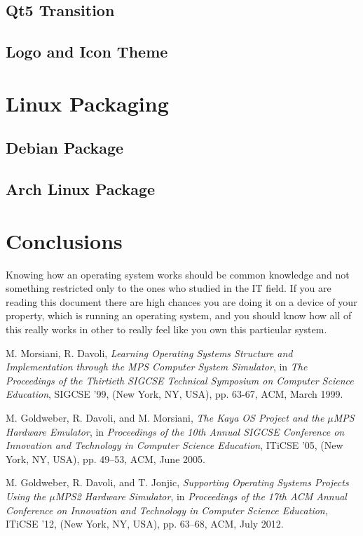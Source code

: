 \documentclass[12pt,a4paper,openright,twoside]{report}
\begin{document}
\section{Qt5 Transition}
\section{Logo and Icon Theme}
\chapter{Linux Packaging}
\lhead[\fancyplain{}{\bfseries\thepage}]{\fancyplain{}{\bfseries\rightmark}}
\section{Debian Package}
\section{Arch Linux Package}
\chapter{Conclusions}
\lhead[\fancyplain{}{\bfseries\thepage}]{\fancyplain{}{\bfseries\rightmark}}
	Knowing how an operating system works should be common knowledge and not something restricted only to the ones who studied in the IT field.
	If you are reading this document there are high chances you are doing it on a device of your property, which is running an operating system, and you should know how all of this really works in other to really feel like you own this particular system.
\begin{thebibliography}{99}

	M. Morsiani, R. Davoli,
	\textit{Learning Operating Systems Structure and Implementation through the MPS Computer System Simulator},
	in \textit{The Proceedings of the Thirtieth SIGCSE Technical Symposium on Computer Science Education},
	SIGCSE ’99, (New York, NY, USA), pp. 63-67, ACM, March 1999.

	M. Goldweber, R. Davoli, and M. Morsiani,
	\textit{The Kaya OS Project and the $\mu$MPS Hardware Emulator},
	in \textit{Proceedings of the 10th Annual SIGCSE Conference on Innovation and Technology in Computer Science Education},
	ITiCSE ’05, (New York, NY, USA), pp. 49–53, ACM, June 2005.
	
	M. Goldweber, R. Davoli, and T. Jonjic,
	\textit{Supporting Operating Systems Projects Using the $\mu$MPS2 Hardware Simulator},
	in \textit{Proceedings of the 17th ACM Annual Conference on Innovation and Technology in Computer Science Education},
	ITiCSE ’12, (New York, NY, USA), pp. 63–68, ACM, July 2012.

\end{thebibliography}
\end{document}
